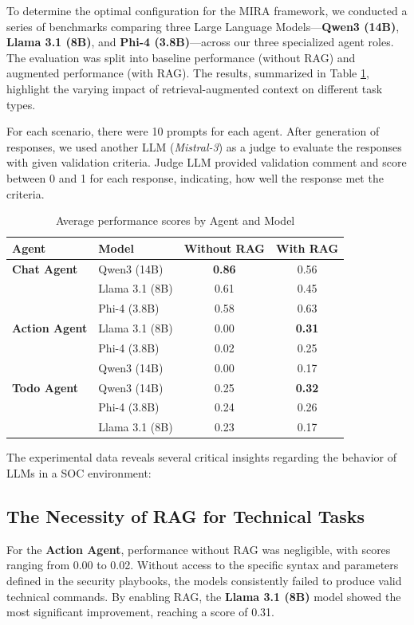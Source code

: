 \documentclass[conference]{IEEEtran}
\begin{document}
To determine the optimal configuration for the MIRA framework, we conducted a series of benchmarks comparing three Large Language Models—\textbf{Qwen3 (14B)}, 
\textbf{Llama 3.1 (8B)}, and \textbf{Phi-4 (3.8B)}—across our three specialized agent roles. The evaluation was split into baseline performance (without RAG) and augmented performance (with RAG). 
The results, summarized in Table \ref{tab:model_results}, highlight the varying impact of retrieval-augmented context on different task types.

For each scenario, there were 10 prompts for each agent. After generation of responses, we used another LLM (\textit{Mistral-3}) as a judge to evaluate the responses with given validation criteria.
Judge LLM provided validation comment and score between 0 and 1 for each response, indicating, how well the response met the criteria.

\begin{table}[htbp]
\centering
\caption{Average performance scores by Agent and Model}
\label{tab:model_results}
\begin{tabular}{llcc}
\toprule
\textbf{Agent} & \textbf{Model} & \textbf{Without RAG} & \textbf{With RAG} \\
\midrule
\textbf{Chat Agent} & Qwen3 (14B) & \textbf{0.86} & 0.56 \\
& Llama 3.1 (8B) & 0.61 & 0.45 \\
& Phi-4 (3.8B) & 0.58 & 0.63 \\
\midrule
\textbf{Action Agent} & Llama 3.1 (8B) & 0.00 & \textbf{0.31} \\
& Phi-4 (3.8B) & 0.02 & 0.25 \\
& Qwen3 (14B) & 0.00 & 0.17 \\
\midrule
\textbf{Todo Agent} & Qwen3 (14B) & 0.25 & \textbf{0.32} \\
& Phi-4 (3.8B) & 0.24 & 0.26 \\
& Llama 3.1 (8B) & 0.23 & 0.17 \\
\bottomrule
\end{tabular}
\end{table}

The experimental data reveals several critical insights regarding the behavior of LLMs in a SOC environment:

\subsection{The Necessity of RAG for Technical Tasks}
For the \textbf{Action Agent}, performance without RAG was negligible, with scores ranging from 0.00 to 0.02. 
Without access to the specific syntax and parameters defined in the security playbooks, 
the models consistently failed to produce valid technical commands. 
By enabling RAG, the \textbf{Llama 3.1 (8B)} model showed the most significant improvement, reaching a score of 0.31. 
\end{document}
